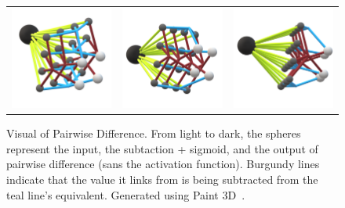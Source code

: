\begin{figure}
    \begin{center}
        \begin{tabular}{c c c}
            \includegraphics[width = 2in]{Friendly/LaTeX/figures/pairwiseview1.png} & \includegraphics[width = 2in]{Friendly/LaTeX/figures/pairwiseview2.png} & \includegraphics[width = 2in]{Friendly/LaTeX/figures/pairwiseview3.png}
        \end{tabular}
    \end{center}
    \caption{Visual of Pairwise Difference. From light to dark, the spheres represent the input, the
             subtaction + sigmoid, and the output of pairwise difference (sans the activation
             function). Burgundy lines indicate that the value it links from is being subtracted
             from the teal line's equivalent. Generated using Paint 3D~\cite{msftprogram}.}
    \label{pairwisedepiction}
\end{figure}

